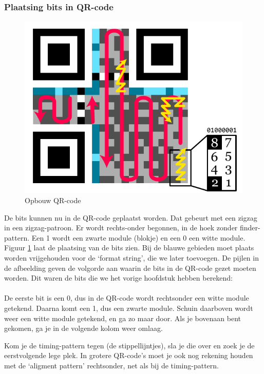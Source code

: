 \documentclass{article}
\begin{document}
\subsubsection{Plaatsing bits in QR-code}
\begin{figure}[h]
\centering
\includegraphics[width=0.7\linewidth]{qr-zigzag.pdf}
\caption{Opbouw QR-code}
\label{fig:zigzag}
\end{figure}
De bits kunnen nu in de QR-code geplaatst worden. Dat gebeurt met een zigzag in een zigzag-patroon. Er wordt rechts-onder begonnen, in de hoek zonder finder-pattern. Een 1 wordt een zwarte module (blokje) en een 0 een witte module.
Figuur \ref{fig:zigzag} laat de plaatsing van de bits zien. Bij de blauwe gebieden moet plaats worden vrijgehouden voor de `format string', die we later toevoegen. De pijlen in de afbeelding geven de volgorde aan waarin de bits in de QR-code gezet moeten worden. Dit waren de bits die we het vorige hoofdstuk hebben berekend:\\\\
De eerste bit is een 0, dus in de QR-code wordt rechtsonder een witte module getekend. Daarna komt een 1, dus een zwarte module. Schuin daarboven wordt weer een witte module getekend, en ga zo maar door. Als je bovenaan bent gekomen, ga je in de volgende kolom weer omlaag.

Kom je de timing-pattern tegen (de stippellijntjes), sla je die over en zoek je de eerstvolgende lege plek. In grotere QR-code's moet je ook nog rekening houden met de `aligment pattern'  rechtsonder, net als bij de timing-pattern.
\end{document}

